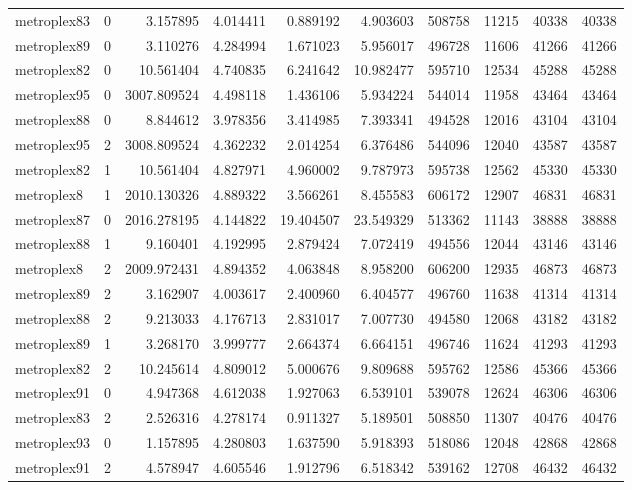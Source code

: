 \begin{longtable}{|l|r|r|r|r|r|r|r|r|r|}
metroplex83 & 0 & 3.157895 & 4.014411 & 0.889192 & 4.903603 & 508758 & 11215 & 40338 & 40338 \\
metroplex89 & 0 & 3.110276 & 4.284994 & 1.671023 & 5.956017 & 496728 & 11606 & 41266 & 41266 \\
metroplex82 & 0 & 10.561404 & 4.740835 & 6.241642 & 10.982477 & 595710 & 12534 & 45288 & 45288 \\
metroplex95 & 0 & 3007.809524 & 4.498118 & 1.436106 & 5.934224 & 544014 & 11958 & 43464 & 43464 \\
metroplex88 & 0 & 8.844612 & 3.978356 & 3.414985 & 7.393341 & 494528 & 12016 & 43104 & 43104 \\
metroplex95 & 2 & 3008.809524 & 4.362232 & 2.014254 & 6.376486 & 544096 & 12040 & 43587 & 43587 \\
metroplex82 & 1 & 10.561404 & 4.827971 & 4.960002 & 9.787973 & 595738 & 12562 & 45330 & 45330 \\
metroplex8 & 1 & 2010.130326 & 4.889322 & 3.566261 & 8.455583 & 606172 & 12907 & 46831 & 46831 \\
metroplex87 & 0 & 2016.278195 & 4.144822 & 19.404507 & 23.549329 & 513362 & 11143 & 38888 & 38888 \\
metroplex88 & 1 & 9.160401 & 4.192995 & 2.879424 & 7.072419 & 494556 & 12044 & 43146 & 43146 \\
metroplex8 & 2 & 2009.972431 & 4.894352 & 4.063848 & 8.958200 & 606200 & 12935 & 46873 & 46873 \\
metroplex89 & 2 & 3.162907 & 4.003617 & 2.400960 & 6.404577 & 496760 & 11638 & 41314 & 41314 \\
metroplex88 & 2 & 9.213033 & 4.176713 & 2.831017 & 7.007730 & 494580 & 12068 & 43182 & 43182 \\
metroplex89 & 1 & 3.268170 & 3.999777 & 2.664374 & 6.664151 & 496746 & 11624 & 41293 & 41293 \\
metroplex82 & 2 & 10.245614 & 4.809012 & 5.000676 & 9.809688 & 595762 & 12586 & 45366 & 45366 \\
metroplex91 & 0 & 4.947368 & 4.612038 & 1.927063 & 6.539101 & 539078 & 12624 & 46306 & 46306 \\
metroplex83 & 2 & 2.526316 & 4.278174 & 0.911327 & 5.189501 & 508850 & 11307 & 40476 & 40476 \\
metroplex93 & 0 & 1.157895 & 4.280803 & 1.637590 & 5.918393 & 518086 & 12048 & 42868 & 42868 \\
metroplex91 & 2 & 4.578947 & 4.605546 & 1.912796 & 6.518342 & 539162 & 12708 & 46432 & 46432 \\

\end{longtable}
